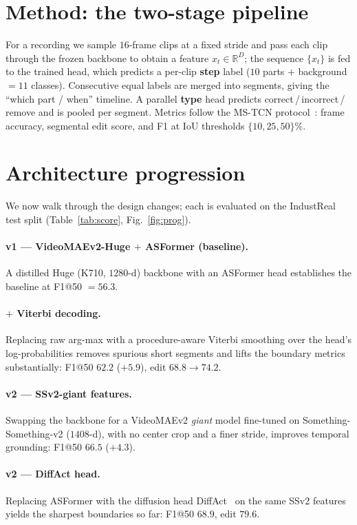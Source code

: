\documentclass[11pt]{article}
\begin{document}
\section{Method: the two-stage pipeline}
For a recording we sample $16$-frame clips at a fixed stride and pass each clip through the frozen backbone to
obtain a feature $x_t \in \mathbb{R}^{D}$; the sequence $\{x_t\}$ is fed to the trained head, which predicts a
per-clip \textbf{step} label ($10$ parts $+$ background $=11$ classes). Consecutive equal labels are merged into
segments, giving the ``which part / when'' timeline. A parallel \textbf{type} head predicts
correct\,/\,incorrect\,/\,remove and is pooled per segment. Metrics follow the MS-TCN protocol~\cite{mstcn}:
frame accuracy, segmental edit score, and F1 at IoU thresholds $\{10,25,50\}\%$.

\section{Architecture progression}
\label{sec:prog}
We now walk through the design changes; each is evaluated on the IndustReal test split (Table~\ref{tab:score},
Fig.~\ref{fig:prog}).

\paragraph{v1 --- VideoMAEv2-Huge $+$ ASFormer (baseline).}
A distilled Huge (K710, $1280$-d) backbone with an ASFormer head establishes the baseline at F1@50 $=56.3$.

\paragraph{$+$ Viterbi decoding.}
Replacing raw arg-max with a procedure-aware Viterbi smoothing over the head's log-probabilities removes spurious
short segments and lifts the boundary metrics substantially: F1@50 $62.2$ ($+5.9$), edit $68.8\!\to\!74.2$.

\paragraph{v2 --- SSv2-giant features.}
Swapping the backbone for a VideoMAEv2 \emph{giant} model fine-tuned on Something-Something-v2 ($1408$-d), with
no center crop and a finer stride, improves temporal grounding: F1@50 $66.5$ ($+4.3$).

\paragraph{v2 --- DiffAct head.}
Replacing ASFormer with the diffusion head DiffAct~\cite{diffact} on the same SSv2 features yields the sharpest
boundaries so far: F1@50 $68.9$, edit $79.6$.
\end{document}

